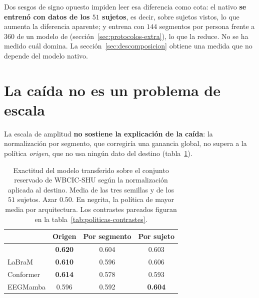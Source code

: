 Dos sesgos de signo opuesto impiden leer esa diferencia como cota: el nativo \textbf{se entrenó con datos de
los $51$ sujetos}, es decir, sobre sujetos vistos, lo que aumenta la diferencia aparente; y entrena con $144$
segmentos por persona frente a $360$ de un modelo de \openbmi{}
(sección~\ref{sec:protocolos-extra}), lo que la reduce. No se ha medido cuál domina. La
sección~\ref{sec:descomposicion} obtiene una medida que no depende del modelo nativo.

\section{La caída no es un problema de escala}

La escala de amplitud \textbf{no sostiene la explicación de la caída}: la normalización por segmento, que
corregiría una ganancia global, no supera a la política \emph{origen}, que no usa ningún dato del destino
(tabla~\ref{tab:politicas}).

\begin{table}[H]
\centering
\caption{Exactitud del modelo transferido sobre el conjunto reservado de WBCIC-SHU según la
normalización aplicada al destino. Media de las tres semillas y de los $51$ sujetos. Azar
$0.50$. En negrita, la política de mayor media por arquitectura. Los contrastes pareados figuran
en la tabla~\ref{tab:politicas-contrastes}.}
\label{tab:politicas}
\small
\begin{tabular}{lccc}
\toprule
 & \textbf{Origen} & \textbf{Por segmento} & \textbf{Por sujeto} \\
\midrule
\eegnet{} & \textbf{0.620} & 0.604 & 0.603 \\
LaBraM & \textbf{0.610} & 0.596 & 0.606 \\
Conformer & \textbf{0.614} & 0.578 & 0.593 \\
EEGMamba & 0.596 & 0.592 & \textbf{0.604} \\
\bottomrule
\end{tabular}
\end{table}

